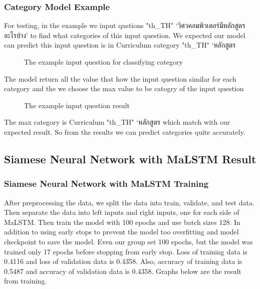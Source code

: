 \documentclass[12pt,oneside,openright,a4paper]{cpe-english-project}
\begin{document}
\subsubsection{Category Model Example}
For testing, in the example we input qustions {
\XeTeXlinebreaklocale "th_TH"	
\thaifont 
 ‘วิศวคอมพิวเตอร์มีหลักสูตรอะไรบ้าง’ }to find what categories of this input question. We expected our model can predict this input question is in Curriculum category  {
\XeTeXlinebreaklocale "th_TH"	
\thaifont 
 ‘หลักสูตร } 
\begin{figure}[!h]\centering
{}
\caption{The example input question for classifying category}\label{fig:The example input question for classifying category}
\end{figure}
The model return all the value that how the input question similar for each category and the we choose the max value to be catogry of the input question
\begin{figure}[!h]\centering
{}
\caption{The example input question result}\label{fig:The example input question result}
\end{figure}
\pagebreak
The max category is Curriculum {
\XeTeXlinebreaklocale "th_TH"	
\thaifont 
 ‘หลักสูตร } which match with our expected result. So from the results we can predict categories quite accurately. 
\subsection{Siamese Neural Network with MaLSTM Result}
\subsubsection{Siamese Neural Network with MaLSTM Training}
\label{siamese_result}
After preprocessing the data, we split the data into train, validate, and test data. Then separate the data into left inputs and right inputs, one for each side of MaLSTM. Then train the model with 100 epochs and use batch sizes 128. In addition to using early stops to prevent the model too overfitting and model checkpoint to save the model. Even our group set 100 epochs, but the model was trained only 17 epochs before stopping from early stop. Loss of training data is 0.4116 and loss of validation data is 0.4358. Also, accuracy of training data is 0.5487 and accuracy of validation data is 0.4358. Graphs below are the result from training.
\end{document}
